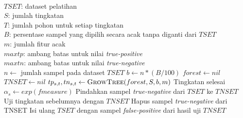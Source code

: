 \begin{center}
	\label{alg:crf}
	\begin{algorithmic}[1]
\Require \\
$ TSET $: dataset pelatihan \\
$ S $: jumlah tingkatan \\
$ T $: jumlah pohon untuk setiap tingkatan \\
$ B $: persentase sampel yang dipilih secara acak tanpa diganti dari $TSET$ \\
$ m $: jumlah fitur acak \\
$ maxtp $: ambang batas untuk nilai \textit{true-positive} \\
$ maxtn $: ambang batas untuk nilai \textit{true-negative}
\\
	\State $ n \gets $ jumlah sampel pada dataset $ TSET $
	\State $ b \gets n * (B / 100) $
	\State $ forest \gets nil $
	\State $ TNSET \gets nil $
			\State $ tp_{s,t}, tn_{s,t} \gets \Call{GrowTree}{forest, S, b, m} $
				\State Tingkatan selesai
			\EndIf
		\EndFor
		\State $\alpha_{s} \gets exp(fmeasure) $
			\State Pindahkan sampel \textit{true-negative} dari
			$TSET$ ke $TNSET$
		\Else
			\State Uji tingkatan sebelumnya dengan $TNSET$
			\State Hapus sampel \textit{true-negative} dari TNSET
			\State Isi ulang $TSET$ dengan sampel
			\textit{false-positive} dari hasil uji $TNSET$
		\EndIf
	\EndFor
\EndFunction
	\end{algorithmic}
\end{center}
